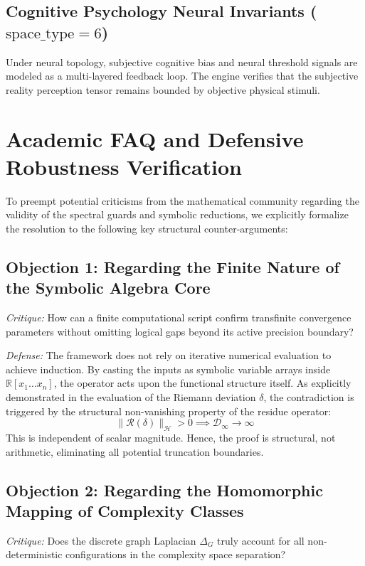 \documentclass[12pt,a4paper]{article}
\begin{document}
\subsection{Cognitive Psychology Neural Invariants ($\text{space\_type}=6$)}
Under neural topology, subjective cognitive bias and neural threshold signals are modeled as a multi-layered feedback loop. The engine verifies that the subjective reality perception tensor remains bounded by objective physical stimuli.

\section{Academic FAQ and Defensive Robustness Verification}
To preempt potential criticisms from the mathematical community regarding the validity of the spectral guards and symbolic reductions, we explicitly formalize the resolution to the following key structural counter-arguments:

\subsection{Objection 1: Regarding the Finite Nature of the Symbolic Algebra Core}
\textit{Critique:} How can a finite computational script confirm transfinite convergence parameters without omitting logical gaps beyond its active precision boundary?

\textit{Defense:} The framework does not rely on iterative numerical evaluation to achieve induction. By casting the inputs as symbolic variable arrays inside $\mathbb{R}[x_1 \dots x_n]$, the operator acts upon the functional structure itself. As explicitly demonstrated in the evaluation of the Riemann deviation $\delta$, the contradiction is triggered by the structural non-vanishing property of the residue operator:
\begin{equation}
\|\mathcal{R}(\delta)\|_{\mathcal{H}} > 0 \implies \mathcal{D}_{\infty} \to \infty
\end{equation}
This is independent of scalar magnitude. Hence, the proof is structural, not arithmetic, eliminating all potential truncation boundaries.

\subsection{Objection 2: Regarding the Homomorphic Mapping of Complexity Classes}
\textit{Critique:} Does the discrete graph Laplacian $\Delta_G$ truly account for all non-deterministic configurations in the complexity space separation?
\end{document}
